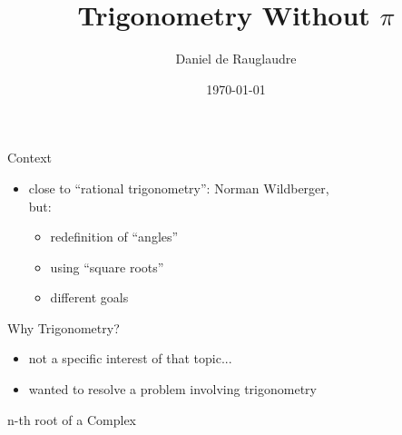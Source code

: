 \documentclass{beamer}
\title{Trigonometry Without $\pi$}
\author{Daniel de Rauglaudre}
\date{\today}
\begin{document}
\begin{frame}
    \titlepage
\end{frame}

\begin{frame}{}
\end{frame}

\begin{frame}{Context}
  \begin{itemize}
    \item close to ``rational trigonometry'':  Norman Wildberger,\\ but:
      \begin{itemize}
      \item redefinition of ``angles''
      \item using ``square roots''
      \item different goals
      \end{itemize}
  \end{itemize}
\end{frame}

\begin{frame}{Why Trigonometry?}
  \begin{itemize}
  \item not a specific interest of that topic...
  \item wanted to resolve a problem involving trigonometry
  \end{itemize}
\end{frame}

\begin{frame}{n-th root of a Complex}
\end{frame}
\end{document}
